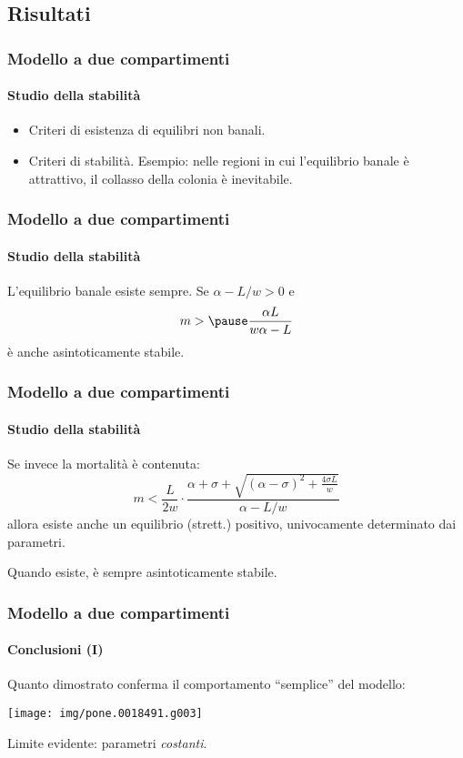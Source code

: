 \documentclass[]{beamer}
\begin{document}
\subsection{Risultati}


\begin{frame}
    \frametitle{Modello a due compartimenti}
    \framesubtitle{Studio della stabilità}

    \begin{itemize}
        \item \pause Criteri di esistenza di equilibri non banali.
        \item \pause Criteri di stabilità. \pause Esempio:
            nelle regioni in cui l'equilibrio banale è attrattivo, il collasso della colonia è inevitabile.
    \end{itemize}
\end{frame}

\begin{frame}
    \frametitle{Modello a due compartimenti}
    \framesubtitle{Studio della stabilità}

    L'equilibrio banale esiste sempre. Se $\alpha -L/w>0$ e
    $$m> \pause \frac{\alpha L}{w \alpha -L}$$
    è anche asintoticamente stabile.
\end{frame}

\begin{frame}
    \frametitle{Modello a due compartimenti}
    \framesubtitle{Studio della stabilità}

    Se invece la mortalità è contenuta:
    $$m < \frac{L}{2w} \cdot \frac{ \alpha + \sigma + \sqrt{ {(\alpha - \sigma)}^2 + \frac{4 \sigma L}{w} } }{\alpha - L/w}$$
    allora esiste anche un equilibrio (strett.) positivo, univocamente determinato dai parametri.

    \pause
    Quando esiste, è sempre asintoticamente stabile.
\end{frame}

\begin{frame}
    \frametitle{Modello a due compartimenti}
    \framesubtitle{Conclusioni (I)}

    Quanto dimostrato conferma il comportamento ``semplice'' del modello:
    \begin{center}
        \texttt{[image: img/pone.0018491.g003]}
    \end{center}

    \pause
    Limite evidente: parametri \emph{costanti}.
\end{frame}
\end{document}
